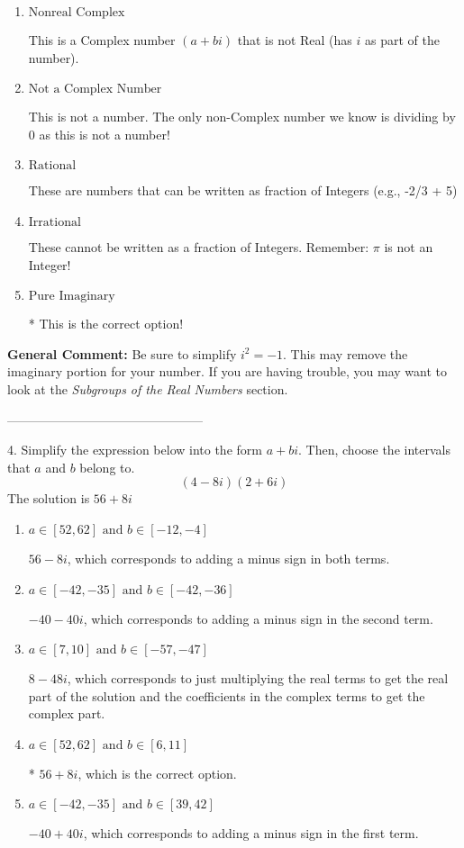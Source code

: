 \documentclass{extbook}[14pt]
\begin{document}
\begin{enumerate}[label=\Alph*.] 
\item $ \text{Nonreal Complex} $ 

 This is a Complex number $(a+bi)$ that is not Real (has $i$ as part of the number). 
\item $ \text{Not a Complex Number} $ 

 This is not a number. The only non-Complex number we know is dividing by 0 as this is not a number! 
\item $ \text{Rational} $ 

 These are numbers that can be written as fraction of Integers (e.g., -2/3 + 5) 
\item $ \text{Irrational} $ 

 These cannot be written as a fraction of Integers. Remember: $\pi$ is not an Integer! 
\item $ \text{Pure Imaginary} $ 

 * This is the correct option! 
\end{enumerate} 
 
\textbf{General Comment:} Be sure to simplify $i^2 = -1$. This may remove the imaginary portion for your number. If you are having trouble, you may want to look at the \textit{Subgroups of the Real Numbers} section. 

-----------------------------------------------

4. Simplify the expression below into the form $a+bi$. Then, choose the intervals that $a$ and $b$ belong to.
\[ (4 - 8 i)(2 + 6 i) \] 
The solution is $ 56 + 8 i $ 

\begin{enumerate}[label=\Alph*.] 
\item $ a \in [52, 62] \text{ and } b \in [-12, -4] $ 

  $56 - 8 i$, which corresponds to adding a minus sign in both terms. 
\item $ a \in [-42, -35] \text{ and } b \in [-42, -36] $ 

  $-40 - 40 i$, which corresponds to adding a minus sign in the second term. 
\item $ a \in [7, 10] \text{ and } b \in [-57, -47] $ 

  $8 - 48 i$, which corresponds to just multiplying the real terms to get the real part of the solution and the coefficients in the complex terms to get the complex part. 
\item $ a \in [52, 62] \text{ and } b \in [6, 11] $ 

 * $56 + 8 i$, which is the correct option. 
\item $ a \in [-42, -35] \text{ and } b \in [39, 42] $ 

  $-40 + 40 i$, which corresponds to adding a minus sign in the first term. 
\end{enumerate} 
 
\end{document}
